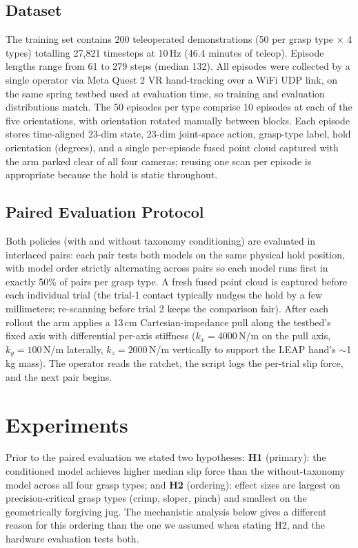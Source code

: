 \documentclass[letterpaper, 10pt, journal, twoside]{IEEEtran}
\begin{document}
\subsection{Dataset}
\label{sec:dataset}
The training set contains 200 teleoperated demonstrations (50 per grasp type $\times$
4 types) totalling 27{,}821 timesteps at 10\,Hz (46.4 minutes of teleop). Episode
lengths range from 61 to 279 steps (median 132). All episodes were collected by a
single operator via Meta Quest 2 VR hand-tracking over a WiFi UDP link, on the same
spring testbed used at evaluation time, so training and evaluation distributions match.
The 50 episodes per type comprise 10 episodes at each of the five orientations, with
orientation rotated manually between blocks. Each episode stores time-aligned 23-dim
state, 23-dim joint-space action, grasp-type label, hold orientation (degrees), and a
single per-episode fused point cloud captured with the arm parked clear of all four
cameras; reusing one scan per episode is appropriate because the hold is static
throughout.

\subsection{Paired Evaluation Protocol}
\label{sec:protocol}
Both policies (with and without taxonomy conditioning) are evaluated in interlaced
pairs: each pair tests both models on the same physical hold position, with model
order strictly alternating across pairs so each model runs first in exactly 50\% of
pairs per grasp type. A fresh fused point cloud is captured before each individual
trial (the trial-1 contact typically nudges the hold by a few millimeters; re-scanning
before trial 2 keeps the comparison fair). After each rollout the arm applies a
13\,cm Cartesian-impedance pull along the testbed's fixed axis with differential
per-axis stiffness ($k_x = 4000$\,N/m on the pull axis, $k_y = 100$\,N/m laterally,
$k_z = 2000$\,N/m vertically to support the LEAP hand's $\sim$1\,kg mass). The
operator reads the ratchet, the script logs the per-trial slip force, and the next
pair begins.

\section{Experiments}
\label{sec:exp}
Prior to the paired evaluation we stated two hypotheses: \textbf{H1}
(primary): the conditioned model achieves higher median slip force than the
without-taxonomy model across all four grasp types; and \textbf{H2}
(ordering): effect sizes are largest on precision-critical grasp
types (crimp, sloper, pinch) and smallest on the geometrically forgiving jug. The
mechanistic analysis below gives a different reason for this ordering than the one we
assumed when stating H2, and the hardware evaluation tests both.
\end{document}
